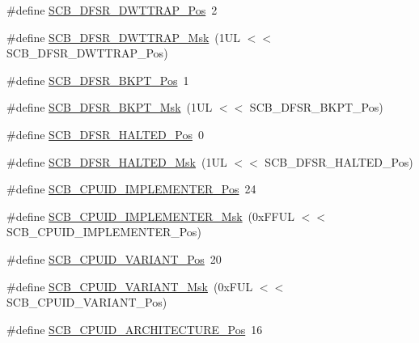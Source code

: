 \begin{DoxyCompactItemize}
\item 
\#define \hyperlink{group___c_m_s_i_s___s_c_b_gaccf82364c6d0ed7206f1084277b7cc61}{S\+C\+B\+\_\+\+D\+F\+S\+R\+\_\+\+D\+W\+T\+T\+R\+A\+P\+\_\+\+Pos}~2
\item 
\#define \hyperlink{group___c_m_s_i_s___s_c_b_ga3f7384b8a761704655fd45396a305663}{S\+C\+B\+\_\+\+D\+F\+S\+R\+\_\+\+D\+W\+T\+T\+R\+A\+P\+\_\+\+Msk}~(1\+U\+L $<$$<$ S\+C\+B\+\_\+\+D\+F\+S\+R\+\_\+\+D\+W\+T\+T\+R\+A\+P\+\_\+\+Pos)
\item 
\#define \hyperlink{group___c_m_s_i_s___s_c_b_gaf28fdce48655f0dcefb383aebf26b050}{S\+C\+B\+\_\+\+D\+F\+S\+R\+\_\+\+B\+K\+P\+T\+\_\+\+Pos}~1
\item 
\#define \hyperlink{group___c_m_s_i_s___s_c_b_ga609edf8f50bc49adb51ae28bcecefe1f}{S\+C\+B\+\_\+\+D\+F\+S\+R\+\_\+\+B\+K\+P\+T\+\_\+\+Msk}~(1\+U\+L $<$$<$ S\+C\+B\+\_\+\+D\+F\+S\+R\+\_\+\+B\+K\+P\+T\+\_\+\+Pos)
\item 
\#define \hyperlink{group___c_m_s_i_s___s_c_b_gaef4ec28427f9f88ac70a13ae4e541378}{S\+C\+B\+\_\+\+D\+F\+S\+R\+\_\+\+H\+A\+L\+T\+E\+D\+\_\+\+Pos}~0
\item 
\#define \hyperlink{group___c_m_s_i_s___s_c_b_ga200bcf918d57443b5e29e8ce552e4bdf}{S\+C\+B\+\_\+\+D\+F\+S\+R\+\_\+\+H\+A\+L\+T\+E\+D\+\_\+\+Msk}~(1\+U\+L $<$$<$ S\+C\+B\+\_\+\+D\+F\+S\+R\+\_\+\+H\+A\+L\+T\+E\+D\+\_\+\+Pos)
\item 
\#define \hyperlink{group___c_m_s_i_s___s_c_b_ga58686b88f94f789d4e6f429fe1ff58cf}{S\+C\+B\+\_\+\+C\+P\+U\+I\+D\+\_\+\+I\+M\+P\+L\+E\+M\+E\+N\+T\+E\+R\+\_\+\+Pos}~24
\item 
\#define \hyperlink{group___c_m_s_i_s___s_c_b_ga0932b31faafd47656a03ced75a31d99b}{S\+C\+B\+\_\+\+C\+P\+U\+I\+D\+\_\+\+I\+M\+P\+L\+E\+M\+E\+N\+T\+E\+R\+\_\+\+Msk}~(0x\+F\+F\+U\+L $<$$<$ S\+C\+B\+\_\+\+C\+P\+U\+I\+D\+\_\+\+I\+M\+P\+L\+E\+M\+E\+N\+T\+E\+R\+\_\+\+Pos)
\item 
\#define \hyperlink{group___c_m_s_i_s___s_c_b_ga104462bd0815391b4044a70bd15d3a71}{S\+C\+B\+\_\+\+C\+P\+U\+I\+D\+\_\+\+V\+A\+R\+I\+A\+N\+T\+\_\+\+Pos}~20
\item 
\#define \hyperlink{group___c_m_s_i_s___s_c_b_gad358dfbd04300afc1824329d128b99e8}{S\+C\+B\+\_\+\+C\+P\+U\+I\+D\+\_\+\+V\+A\+R\+I\+A\+N\+T\+\_\+\+Msk}~(0x\+F\+U\+L $<$$<$ S\+C\+B\+\_\+\+C\+P\+U\+I\+D\+\_\+\+V\+A\+R\+I\+A\+N\+T\+\_\+\+Pos)
\item 
\#define \hyperlink{group___c_m_s_i_s___s_c_b_gaf8b3236b08fb8e840efb682645fb0e98}{S\+C\+B\+\_\+\+C\+P\+U\+I\+D\+\_\+\+A\+R\+C\+H\+I\+T\+E\+C\+T\+U\+R\+E\+\_\+\+Pos}~16
$$
\end{DoxyCompactItemize}
